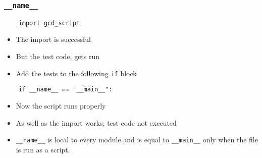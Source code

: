 \begin{frame}[fragile]
  \frametitle{\texttt{\_\_name\_\_}}
  \begin{lstlisting}
    import gcd_script
  \end{lstlisting}
  \begin{itemize}
  \item The import is successful
  \item But the test code, gets run
  \item Add the tests to the following \texttt{if} block
  \end{itemize}
  \begin{lstlisting}
    if __name__ == "__main__":
  \end{lstlisting}
  \begin{itemize}
  \item Now the script runs properly 
  \item As well as the import works; test code not executed
  \item \texttt{\_\_name\_\_} is local to every module and is equal
    to \texttt{\_\_main\_\_} only when the file is run as a script.
  \end{itemize}
\end{frame}

